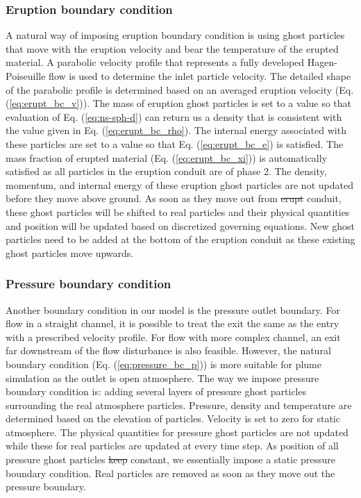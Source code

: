 \documentclass[gmd, manuscript]{copernicus} %
\providecommand{\DIFadd}[1]{{\protect\color{blue}\uwave{#1}}} %
\providecommand{\DIFdel}[1]{{\protect\color{red}\sout{#1}}}                      %
\providecommand{\DIFaddbegin}{} %
\providecommand{\DIFaddend}{} %
\providecommand{\DIFdelbegin}{} %
\providecommand{\DIFdelend}{} %
\begin{document}
\subsubsection{Eruption boundary condition}
A natural way of imposing eruption boundary condition is using ghost particles that move with the eruption velocity and bear the temperature of the erupted material. A parabolic velocity profile that represents a fully developed Hagen-Poiseuille flow is used to determine the inlet particle velocity. The detailed shape of the parabolic profile is determined based on an averaged eruption velocity (Eq. (\ref{eq:erupt_bc_v})). The mass of eruption ghost particles is set to a value so that evaluation of Eq. (\ref{eq:ns-sph-d}) can return us a density that is consistent with the value given in Eq. (\ref{eq:erupt_bc_rho}). 
The internal energy associated with these particles are set to a value so that Eq. (\ref{eq:erupt_bc_e}) is satisfied. The mass fraction of erupted material (Eq. (\ref{eq:erupt_bc_xi})) is automatically satisfied as all particles in the eruption conduit are of phase 2. The density, momentum, and internal energy of these eruption ghost particles are not updated before they move above ground. As soon as they move out from \DIFdelbegin \DIFdel{erupt }\DIFdelend \DIFaddbegin \DIFadd{eruption }\DIFaddend conduit, these ghost particles will be shifted to real particles and their physical quantities and position will be updated based on discretized governing equations. New ghost particles need to be added at the bottom of the eruption conduit as these existing ghost particles move upwards.

\subsubsection{Pressure boundary condition}
Another boundary condition in our model is the pressure outlet boundary. For flow in a straight channel, it is possible to treat the exit the same as the entry with a prescribed velocity profile. For flow with more complex channel, an exit far downstream of the flow disturbance is also feasible. However, the natural boundary condition (Eq. (\ref{eq:pressure_bc_p})) is more suitable for plume simulation as the outlet is open atmosphere. The way we impose pressure boundary condition is: adding several layers of pressure ghost particles surrounding the real atmosphere particles. Pressure, density and temperature are determined based on the elevation of particles. Velocity is set to zero for static atmosphere. The physical quantities for pressure ghost particles are not updated while these for real particles are updated at every time step. As position of all pressure ghost particles \DIFdelbegin \DIFdel{keep }\DIFdelend \DIFaddbegin \DIFadd{keeps }\DIFaddend constant, we essentially impose a static pressure boundary condition. Real particles are removed as soon as they move out \DIFaddbegin \DIFadd{of }\DIFaddend the pressure boundary.
\end{document}
